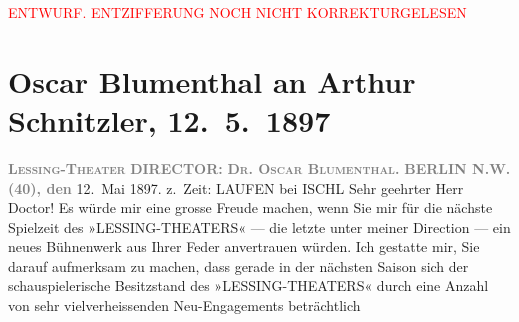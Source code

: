 
\begin{center}
            \textcolor{red}{ENTWURF. ENTZIFFERUNG NOCH NICHT KORREKTURGELESEN}
                      \end{center}
            
               \section[Oscar Blumenthal an Arthur Schnitzler, 12. 5. 1897]{ Oscar Blumenthal an Arthur Schnitzler, 12. 5. 1897}\nopagebreak{}\rehead{ }\begin{ledgroupsized}[t]{13cm}\normalsize\beginnumbering{} \toendnotes[C]{\smallbreak\pagebreak[2]} 
\toendnotes[C]{\smallbreak}\pstart
           \noindent{}\centering{}{\pb}\textcolor{gray}{\textbf{\textsc{Lessing-Theater}}}\pend
           \pstart
           \noindent{}\centering{}\textcolor{gray}{\textbf{DIRECTOR:}}{ }\textcolor{gray}{\textbf{\textsc{Dr. Oscar Blumenthal}.}}\pend
           \pstart
           \noindent{}\raggedleft{}\textcolor{gray}{\textbf{BERLIN N.W. (40), den}}{ }12. Mai 1897.\pend
           \pstart
           \noindent{}\raggedleft{}z. Zeit: LAUFEN bei ISCHL\pend
           \pstart\center{}Sehr geehrter Herr Doctor!\pend\pstart
           Es würde mir eine grosse Freude machen, wenn Sie mir für die nächste Spielzeit des
                  »LESSING-THEATERS« — die letzte unter meiner Direction — ein neues Bühnenwerk aus Ihrer Feder
               anvertrauen würden. Ich gestatte mir, Sie darauf aufmerksam zu machen, dass gerade in
               der nächsten Saison sich der schauspielerische Besitzstand des »LESSING-THEATERS« durch eine Anzahl von sehr vielverheissenden Neu-Engagements beträchtlich

\end{ledgroupsized}
